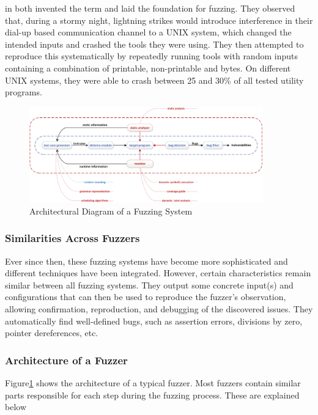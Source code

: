 \documentclass{article}
\begin{document}
\begin{multicols}{2}
  \citeauthor{UNIX} in \citeyear{UNIX} both invented the term and laid the foundation for fuzzing. They observed that, during a stormy night, lightning strikes would introduce interference in their dial-up based communication channel to a UNIX system, which changed the intended inputs and crashed the tools they were using. They then attempted to reproduce this systematically by repeatedly running tools with random inputs containing a combination of printable, non-printable and  bytes. On different UNIX systems, they were able to crash between 25 and 30\% of all tested utility programs.\cite{UNIX}

  \begin{figure}[!tp]
    \centering
    \includegraphics[width=0.9\textwidth]{assets/FuzzingSteps.jpg}
    \caption{Architectural Diagram of a Fuzzing System\cite{Science}}
    \label{fig:FuzzingSteps}
  \end{figure}

  \subsubsection{Similarities Across Fuzzers}
  Ever since then, these fuzzing systems have become more sophisticated and different techniques have been integrated. However, certain characteristics remain similar between all fuzzing systems. They output some concrete input(s) and configurations that can then be used to reproduce the fuzzer's observation, allowing confirmation, reproduction, and debugging of the discovered issues.\cite{EvaluatingFuzzTesting} They automatically find well-defined bugs, such as assertion errors, divisions by zero,  pointer dereferences, etc.\cite{AllYouEverWanted}

  \subsubsection{Architecture of a Fuzzer}
  \label{ArchitectureFuzzer}
  Figure\ref{fig:FuzzingSteps} shows the architecture of a typical fuzzer. Most fuzzers contain similar parts responsible for each step during the fuzzing process. These are explained below


\end{multicols}
\end{document}
